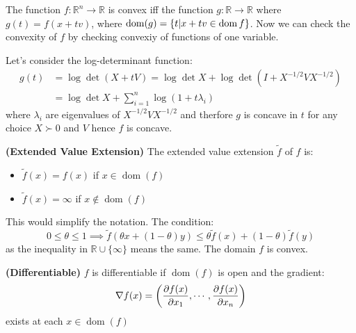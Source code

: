 \begin{proposition}
    The function $f:\mathbb{R}^n\rightarrow \mathbb{R}$ is convex iff the function $g:\mathbb{R}\rightarrow \mathbb{R}$ where $g(t) = f(x+tv)$, where $\operatorname{dom}(g) = \left\{ t | x+tv \in \operatorname{dom} f \right\}$. Now we can check the convexity of $f$ by checking convexiy of functions of one variable.
\end{proposition}

\begin{remark}
    Let's consider the log-determinant function:
    \begin{equation*}
    \begin{aligned}
        g(t) &= \log\det(X + tV) = \log\det X + \log\det(I + X^{-1/2}VX^{-1/2}) \\ 
        &= \log \det X + \sum^n_{i=1}\log(1+t\lambda_i)
    \end{aligned}
    \end{equation*}
    where $\lambda_i$ are eigenvalues of $X^{-1/2}VX^{-1/2}$ and therfore $g$ is concave in $t$ for any choice $X\succ0$ and $V$ hence $f$ is concave.  
\end{remark}

\begin{definition}{\textbf{(Extended Value Extension)}}
    The extended value extension $\tilde{f}$ of $f$ is:
    \begin{itemize}
        \item $\tilde{f}(x)=f(x)$ if $x\in\operatorname{dom}(f)$
        \item $\tilde{f}(x)=\infty$ if $x\not\in\operatorname{dom}(f)$
    \end{itemize}
    This would simplify the notation. The condition:
    \begin{equation*}
        0\le\theta\le1 \implies \tilde{f}(\theta x + (1-\theta)y) \le\theta\tilde{f}(x) + (1-\theta)\tilde{f}(y)
    \end{equation*}
    as the inequality in $\mathbb{R}\cup\{\infty\}$ means the same. The domain $f$ is convex.
\end{definition}

\begin{proposition}{\textbf{(Differentiable)}}
    $f$ is differentiable if $\operatorname{dom}(f)$ is open and the gradient:
    \begin{equation*}
        \nabla f(x) = \left( \frac{\partial f(x)}{\partial x_1}, \cdots, \frac{\partial f(x)}{\partial x_n} \right)
    \end{equation*}
    exists at each $x\in\operatorname{dom}(f)$
\end{proposition}


